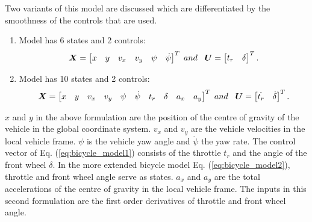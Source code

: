 Two variants of this model are discussed which are differentiated by the smoothness of the controls that are used. 
\begin{enumerate}
	\item	Model has 6 states and 2 controls: 
	\begin{equation}\label{eq:bicycle_model1}
	\centering
	\bm{X} = 
	\begin{bmatrix}
	x & y & v_x & v_y & \psi & \dot{\psi}
	\end{bmatrix}^{T}
	\; and \hspace{2mm} \; \bm{U} = 
	\begin{bmatrix}
	t_r & \delta
	\end{bmatrix}^{T}.
	\end{equation}
	
	\item Model has 10 states and 2 controls:
	\begin{equation}\label{eq:bicycle_model2}
	\centering
	\bm{X} = 
	\begin{bmatrix}
	x & y & v_x & v_y & \psi & \dot{\psi} & t_r & \delta & a_x & a_y
	\end{bmatrix}^{T}
	\; and \hspace{2mm} \; \bm{U} = 
	\begin{bmatrix}
	\dot{t_r} & \dot{\delta}
	\end{bmatrix}^{T}.
	\end{equation}
\end{enumerate}


$x$ and $y$ in the above formulation are the position of the centre of gravity of the vehicle in the global coordinate system. $v_x$ and $v_y$ are the vehicle velocities in the local vehicle frame. $\psi$ is the vehicle yaw angle and $\dot{\psi}$ the yaw rate. The control vector of Eq. (\ref{eq:bicycle_model1}) consists of the throttle $t_r$ and the angle of the front wheel $\delta$. In the more extended bicycle model Eq. (\ref{eq:bicycle_model2}), throttle and front wheel angle serve as states. $a_x$ and $a_y$ are the total accelerations of the centre of gravity in the local vehicle frame. The inputs in this second formulation are the first order derivatives of throttle and front wheel angle.\\


